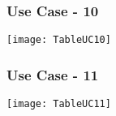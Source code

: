 \begin{figure}[ht]
\subsubsection{Use Case - 10}
\centering
\texttt{[image: TableUC10]}
\end{figure}

\begin{figure}[ht]
\subsubsection{Use Case - 11}
\centering
\texttt{[image: TableUC11]}
\end{figure}
 

